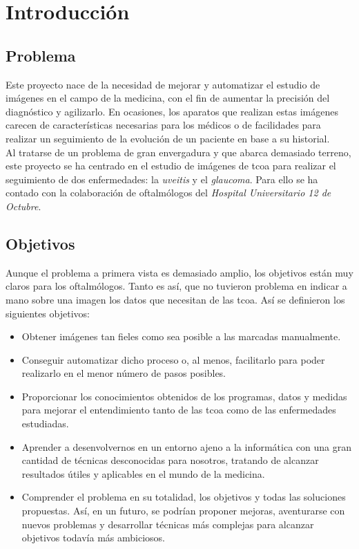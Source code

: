 \chapter{Introducción}
\section{Problema}
Este proyecto nace de la necesidad de mejorar y automatizar el estudio 
de imágenes en el campo de la medicina, con el fin de aumentar la precisión 
del diagnóstico y agilizarlo. En ocasiones, los aparatos que realizan 
estas imágenes carecen de características necesarias para los médicos 
o de facilidades para realizar un seguimiento de la evolución de un paciente 
en base a su historial. \\
Al tratarse de un problema de gran envergadura y que abarca demasiado
terreno, este proyecto se ha centrado en el estudio de imágenes de \gls{tcoa}
para realizar el seguimiento de dos enfermedades: la \emph{uveitis} y
el \emph{glaucoma}. Para ello se ha contado con la colaboración de
oftalmólogos del \emph{Hospital Universitario 12 de Octubre}.

\section{Objetivos}
Aunque el problema a primera vista es demasiado amplio,
los objetivos están muy claros para los oftalmólogos. Tanto es así, 
que no tuvieron problema en indicar a mano sobre una imagen los datos que 
necesitan de las \gls{tcoa}. Así se definieron los siguientes objetivos:
\begin{itemize}
\item Obtener imágenes tan fieles como sea posible a las marcadas
  manualmente.
\item Conseguir automatizar dicho proceso o, al menos,
  facilitarlo para poder realizarlo en el menor número de pasos posibles.
\item Proporcionar los conocimientos obtenidos de los programas, datos y
  medidas para mejorar el entendimiento tanto de las \gls{tcoa}
  como de las enfermedades estudiadas.
\item Aprender a desenvolvernos en un entorno ajeno a la informática
  con una gran cantidad de técnicas desconocidas para nosotros, tratando 
  de alcanzar resultados útiles y aplicables en el mundo de la medicina.
\item Comprender el problema en su totalidad, los objetivos y todas
  las soluciones propuestas. Así, en un futuro, se podrían proponer mejoras,
  aventurarse con nuevos problemas y desarrollar técnicas más complejas
  para alcanzar objetivos todavía más ambiciosos.
\end{itemize}
